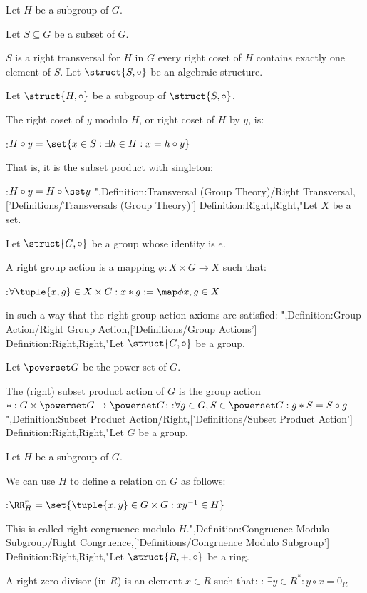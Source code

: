 Let $H$ be a subgroup of $G$.

Let $S \subseteq G$ be a subset of $G$.


$S$ is a right transversal for $H$ in $G$  every right coset of $H$ contains exactly one element of $S$.
Let $\struct {S, \circ}$ be an algebraic structure.

Let $\struct {H, \circ}$ be a subgroup of $\struct {S, \circ}$.


The right coset of $y$ modulo $H$, or right coset of $H$ by $y$, is:

:$H \circ y = \set {x \in S: \exists h \in H: x = h \circ y}$


That is, it is the subset product with singleton:

:$H \circ y = H \circ \set y$
",Definition:Transversal (Group Theory)/Right Transversal,['Definitions/Transversals (Group Theory)']
Definition:Right,Right,"Let $X$ be a set.

Let $\struct {G, \circ}$ be a group whose identity is $e$.


A right group action is a mapping $\phi: X \times G \to X$ such that:

:$\forall \tuple {x, g} \in X \times G : x * g := \map \phi {x, g} \in X$

in such a way that the right group action axioms are satisfied:
",Definition:Group Action/Right Group Action,['Definitions/Group Actions']
Definition:Right,Right,"Let $\struct {G, \circ}$ be a group.

Let $\powerset G$ be the power set of $G$.


The (right) subset product action of $G$ is the group action $*: G \times \powerset G \to \powerset G$:
:$\forall g \in G, S \in \powerset G: g * S = S \circ g$",Definition:Subset Product Action/Right,['Definitions/Subset Product Action']
Definition:Right,Right,"Let $G$ be a group.

Let $H$ be a subgroup of $G$.


We can use $H$ to define a relation on $G$ as follows:

:$\RR^r_H = \set {\tuple {x, y} \in G \times G: x y^{-1} \in H}$

This is called right congruence modulo $H$.",Definition:Congruence Modulo Subgroup/Right Congruence,['Definitions/Congruence Modulo Subgroup']
Definition:Right,Right,"Let $\struct {R, +, \circ}$ be a ring.


A right zero divisor (in $R$) is an element $x \in R$ such that:
: $\exists y \in R^*: y \circ x = 0_R$

